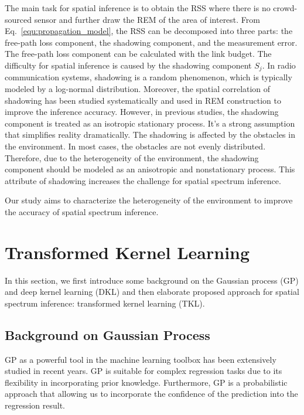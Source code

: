 \documentclass[journal, oneside, twocolumn]{IEEEtran}
\begin{document}
The main task for spatial inference is to obtain the RSS where there is no crowd-sourced sensor and further draw the REM of the area of interest. From Eq.~\eqref{equ:propagation_model}, the RSS can be decomposed into three parts: the free-path loss component, the shadowing component, and the measurement error. The free-path loss component can be calculated with the link budget. The difficulty for spatial inference is caused by the shadowing component $S_j$\cite{Xu2021}. In radio communication systems, shadowing is a random phenomenon, which is typically modeled by a log-normal distribution\cite{Cho2010}. Moreover, the spatial correlation of shadowing has been studied systematically\cite{Agrawal2009, Gudmundson1991} and used in REM construction to improve the inference accuracy\cite{Han2019, Sato2017, Xu2021}. However, in previous studies, the shadowing component is treated as an isotropic stationary process. It's a strong assumption that simplifies reality dramatically. The shadowing is affected by the obstacles in the environment. In most cases, the obstacles are not evenly distributed. Therefore, due to the heterogeneity of the environment, the shadowing component should be modeled as an anisotropic and nonstationary process. This attribute of shadowing increases the challenge for spatial spectrum inference. 

Our study aims to characterize the heterogeneity of the environment to improve the accuracy of spatial spectrum inference.

\section{Transformed Kernel Learning}

In this section, we first introduce some background on the Gaussian process (GP) and deep kernel learning (DKL) and then elaborate proposed approach for spatial spectrum inference: transformed kernel learning (TKL).

\subsection{Background on Gaussian Process}
GP as a powerful tool in the machine learning toolbox \cite{Rasmussen2006} has been extensively studied in recent years\cite{Damianou2013, Wilson2013,Duvenaud2014a,Salimbeni2017a, Lee2018,Wilson2019}. GP is suitable for complex regression tasks due to its flexibility in incorporating prior knowledge. Furthermore, GP is a probabilistic approach that allowing us to incorporate the confidence of the prediction into the regression result.
\end{document}
